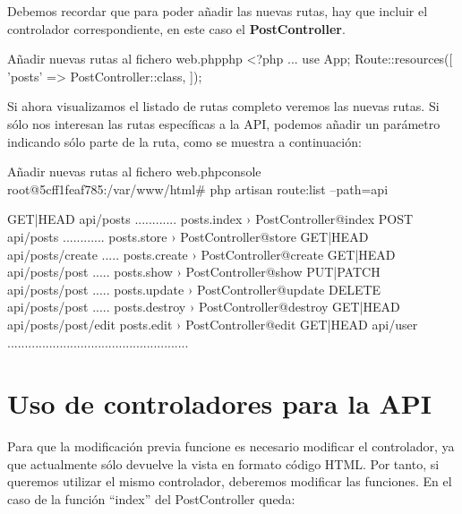 Debemos recordar que para poder añadir las nuevas rutas, hay que incluir el controlador correspondiente, en este caso el \textbf{PostController}.

\begin{mycode}{Añadir nuevas rutas al fichero web.php}{php}{}
<?php
...
use App\Http\Controllers\PostController;
Route::resources([
    'posts' => PostController::class,
]);
\end{mycode}

Si ahora visualizamos el listado de rutas completo veremos las nuevas rutas. Si sólo nos interesan las rutas específicas a la API, podemos añadir un parámetro indicando sólo parte de la ruta, como se muestra a continuación:


\begin{mycode}{Añadir nuevas rutas al fichero web.php}{console}{{\small }}
root@5cff1feaf785:/var/www/html# php artisan route:list --path=api

GET|HEAD        api/posts ............ posts.index › PostController@index
POST            api/posts ............ posts.store › PostController@store
GET|HEAD        api/posts/create ..... posts.create › PostController@create
GET|HEAD        api/posts/{post} ..... posts.show › PostController@show
PUT|PATCH       api/posts/{post} ..... posts.update › PostController@update
DELETE          api/posts/{post} ..... posts.destroy › PostController@destroy
GET|HEAD        api/posts/{post}/edit  posts.edit › PostController@edit
GET|HEAD        api/user ....................................................
\end{mycode}


\chapter{Uso de controladores para la API}

Para que la modificación previa funcione es necesario modificar el controlador, ya que actualmente sólo devuelve la vista en formato código HTML. Por tanto, si queremos utilizar el mismo controlador, deberemos modificar las funciones. En el caso de la función “index” del PostController queda:




